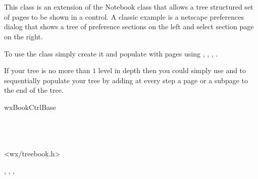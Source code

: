 
\section{}\label{wxtreebook}

This class is an extension of the Notebook class that allows a tree structured
set of pages to be shown in a control.
A classic example is a netscape preferences dialog that shows a tree
of preference sections on the left and select section page on the right.

To use the class simply create it and populate with pages using
,
,
,
.

If your tree is no more than $1$ level in depth then you could
simply use  and 
 to sequentially populate your tree
by adding at every step a page or a subpage to the end of the tree.



wxBookCtrlBase\\
\\
\\
\\



<wx/treebook.h>





, , , 





